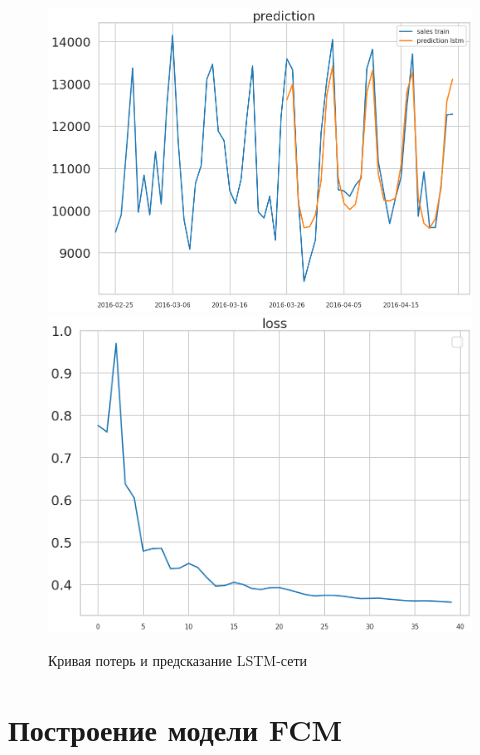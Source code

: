 \def\figurename{Рис}
\begin{figure}[t]
	\centering
	\includegraphics[width=0.4\columnwidth]{./img/lstm_prediction.png}
	\includegraphics[width=0.4\columnwidth]{./img/lstm_loss.png}
	\caption{Кривая потерь и предсказание LSTM-сети}
	\label{img:lstm_forecast}
\end{figure}

\section{Построение модели FCM}






